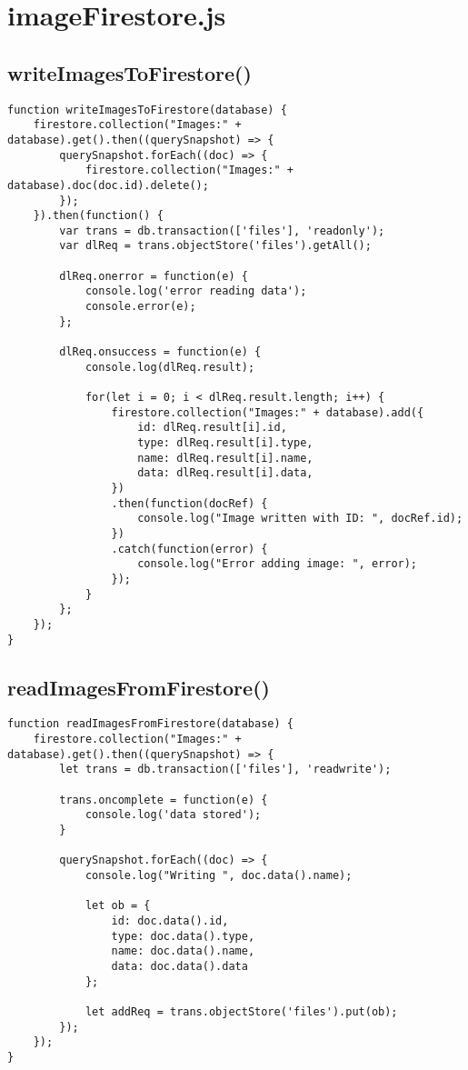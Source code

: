 \documentclass[letterpaper]{article}
\begin{document}
\section{imageFirestore.js}

\subsection{writeImagesToFirestore()}

\begin{lstlisting}[firstnumber=1]
function writeImagesToFirestore(database) {
    firestore.collection("Images:" + database).get().then((querySnapshot) => {
        querySnapshot.forEach((doc) => {
            firestore.collection("Images:" + database).doc(doc.id).delete();
        });
    }).then(function() {
        var trans = db.transaction(['files'], 'readonly');
        var dlReq = trans.objectStore('files').getAll();

        dlReq.onerror = function(e) {
            console.log('error reading data');
            console.error(e);
        };

        dlReq.onsuccess = function(e) {
            console.log(dlReq.result);

            for(let i = 0; i < dlReq.result.length; i++) {
                firestore.collection("Images:" + database).add({
                    id: dlReq.result[i].id,
                    type: dlReq.result[i].type,
                    name: dlReq.result[i].name,
                    data: dlReq.result[i].data,
                })
                .then(function(docRef) {
                    console.log("Image written with ID: ", docRef.id);
                })
                .catch(function(error) {
                    console.log("Error adding image: ", error);
                });
            }
        };
    });
}
\end{lstlisting}

\subsection{readImagesFromFirestore()}

\begin{lstlisting}[firstnumber=36]
function readImagesFromFirestore(database) {
    firestore.collection("Images:" + database).get().then((querySnapshot) => {
        let trans = db.transaction(['files'], 'readwrite');

        trans.oncomplete = function(e) {
            console.log('data stored');
        }

        querySnapshot.forEach((doc) => {
            console.log("Writing ", doc.data().name);

            let ob = {
                id: doc.data().id,
                type: doc.data().type,
                name: doc.data().name,
                data: doc.data().data
            };

            let addReq = trans.objectStore('files').put(ob);
        });
    });
}
\end{lstlisting}
\end{document}
